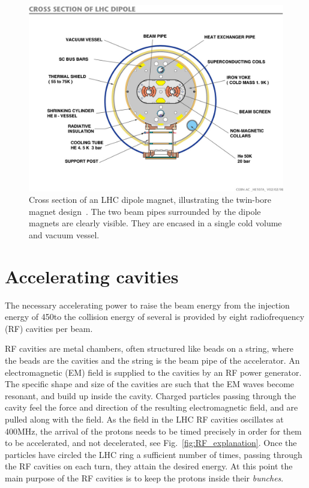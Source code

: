 \begin{figure}[t]
  \centering
  \includegraphics[width=\textwidth,clip=true,trim=0 2cm 0 2cm]
  {figures/lhc/lhc_dipole_cross_section_cds841539.jpg} 
  \caption{Cross section of an LHC dipole magnet, illustrating the twin-bore magnet
design~\cite{cds:841539}. The two beam pipes surrounded by the dipole magnets are clearly
visible. They are encased in a single cold volume and vacuum vessel. 
  \label{fig:lhc_twin_bore}}
\end{figure}


\section{Accelerating cavities}

The necessary accelerating power to raise the beam energy from the injection energy of 450\GeV to
the collision energy of several \TeV is provided by eight radiofrequency (RF) cavities per beam. 

RF cavities are metal chambers, often structured like beads on a string, where the beads are the
cavities and the string is the beam pipe of the accelerator.
An electromagnetic (EM) field is supplied to the cavities by an RF power generator. The specific
shape and size of the cavities are such that the EM waves become resonant, and build up inside the
cavity. 
Charged particles passing through the cavity feel the force and direction of the resulting
electromagnetic field, and are pulled along with the field. 
As the field in the LHC RF cavities oscillates at 400\unit{MHz}, the arrival of the protons needs to
be timed precisely in order for them to be accelerated, and not decelerated, see 
Fig.~\ref{fig:RF_explanation}. 
Once the particles have circled the LHC ring a sufficient number of times, passing through
the RF cavities on each turn, they attain the desired energy. At this point the main purpose of the
RF cavities is to keep the protons inside their \textit{bunches}. 


